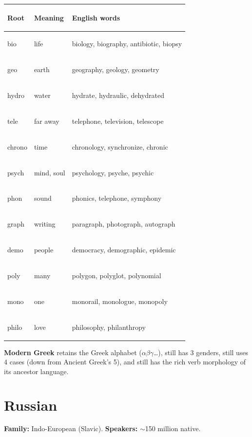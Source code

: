 \documentclass[11pt, letterpaper]{article}
\begin{document}
\noindent
{\renewcommand{\arraystretch}{1.4}
\begin{tabularx}{\textwidth}{>{\bfseries\raggedright\arraybackslash}p{2.5cm}
                              >{\raggedright\arraybackslash}p{3.5cm}
                              >{\raggedright\arraybackslash}X}
\toprule
\rowcolor{tableheaderbrown}
\textbf{Root} & \textbf{Meaning} & \textbf{English words} \\
\midrule
\rowcolor{rowBr} bio       & life     & biology, biography, antibiotic, biopsy \\
\rowcolor{rowA}  geo       & earth    & geography, geology, geometry \\
\rowcolor{rowBr} hydro     & water    & hydrate, hydraulic, dehydrated \\
\rowcolor{rowA}  tele      & far away & telephone, television, telescope \\
\rowcolor{rowBr} chrono    & time     & chronology, synchronize, chronic \\
\rowcolor{rowA}  psych     & mind, soul& psychology, psyche, psychic \\
\rowcolor{rowBr} phon      & sound    & phonics, telephone, symphony \\
\rowcolor{rowA}  graph     & writing  & paragraph, photograph, autograph \\
\rowcolor{rowBr} demo      & people   & democracy, demographic, epidemic \\
\rowcolor{rowA}  poly      & many     & polygon, polyglot, polynomial \\
\rowcolor{rowBr} mono      & one      & monorail, monologue, monopoly \\
\rowcolor{rowA}  philo     & love     & philosophy, philanthropy \\
\bottomrule
\end{tabularx}}

\textbf{Modern Greek} retains the Greek alphabet ($\alpha\beta\gamma$\ldots), still has 3 genders, still uses 4 cases (down from Ancient Greek's 5), and still has the rich verb morphology of its ancestor language.

\section*{Russian}

\textbf{Family:} Indo-European (Slavic). \textbf{Speakers:} $\sim$150 million native.
\end{document}
